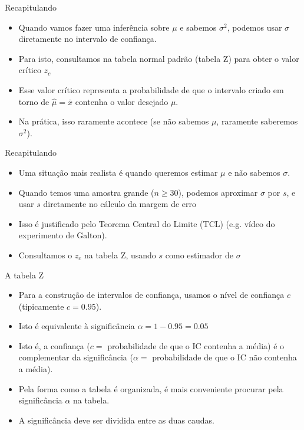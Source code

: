 \documentclass{beamer}
\begin{document}
\begin{frame}{Recapitulando}
  \begin{itemize}
  \item Quando vamos fazer uma inferência sobre $\mu$ e
    \alert{sabemos} $\sigma^2$, podemos usar $\sigma$ diretamente no
    intervalo de confiança.
  \item Para isto, consultamos na tabela normal padrão (tabela Z) para
    obter o valor crítico $z_c$
  \item Esse valor crítico representa a probabilidade de que o
    intervalo criado em torno de $\hat{\mu} = \bar{x}$ contenha o
    valor desejado $\mu$.
  \item Na prática, isso raramente acontece (se não sabemos $\mu$,
    raramente saberemos $\sigma^2$).
  \end{itemize}
\end{frame}

\begin{frame}{Recapitulando}
  \begin{itemize}
  \item Uma situação mais realista é quando queremos estimar $\mu$ e
    não sabemos $\sigma$.
  \item Quando temos uma \alert{amostra grande} ($n \ge 30$), podemos
    aproximar $\sigma$ por $s$, e usar $s$ diretamente no cálculo
    da margem de erro
  \item Isso é justificado pelo Teorema Central do Limite (TCL) (e.g.
    vídeo do experimento de Galton).
  \item Consultamos o $z_c$ na tabela Z, usando $s$ como estimador de
    $\sigma$
  \end{itemize}
\end{frame}

\begin{frame}{A tabela Z}
  \begin{itemize}
  \item Para a construção de intervalos de confiança, usamos o nível
    de confiança $c$ (tipicamente $c=0.95$).
  \item Isto é equivalente à \alert{significância} $\alpha = 1-0.95 =
    0.05$
  \item Isto é, a confiança ($c=$ probabilidade de que o IC contenha a
    média) é o complementar da significância ($\alpha=$ probabilidade de que o
    IC não contenha a média).
  \item Pela forma como a tabela é organizada, é mais conveniente
    procurar pela significância $\alpha$ na tabela.
  \item A significância deve ser dividida entre as duas caudas.
  \end{itemize}
\end{frame}
\end{document}
